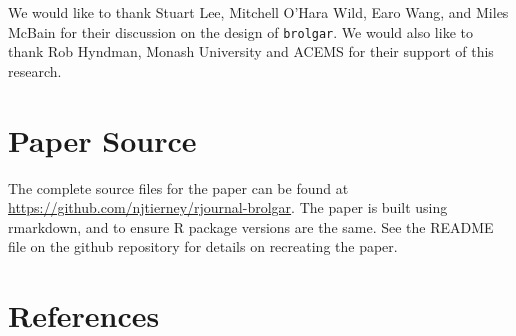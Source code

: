 We would like to thank Stuart Lee, Mitchell O'Hara Wild, Earo Wang, and Miles McBain for their discussion on the design of \texttt{brolgar}. We would also like to thank Rob Hyndman, Monash University and ACEMS for their support of this research.

\hypertarget{paper-source}{%
\section{Paper Source}\label{paper-source}}

The complete source files for the paper can be found at \url{https://github.com/njtierney/rjournal-brolgar}. The paper is built using rmarkdown,  and  to ensure R package versions are the same. See the README file on the github repository for details on recreating the paper.

\hypertarget{references}{%
\section*{References}\label{references}}

